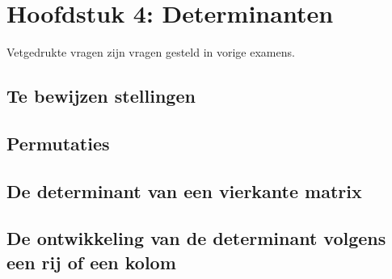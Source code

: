 \documentclass[12pt]{article}
\begin{document}
\date{}    
\maketitle
    \section*{Hoofdstuk 4: Determinanten}
    Vetgedrukte vragen zijn vragen gesteld in vorige examens.
    \setcounter{section}{4}
    \subsection*{Te bewijzen stellingen}
    \subsection{Permutaties}
    \subsection{De determinant van een vierkante matrix}
    \subsection{De ontwikkeling van de determinant volgens een rij of een kolom}
\end{document}

